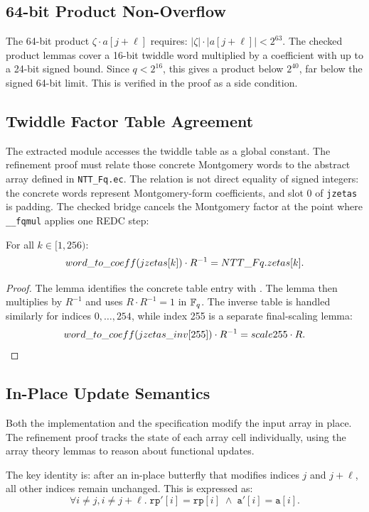 \subsection{64-bit Product Non-Overflow}

The 64-bit product $\zeta \cdot a[j+\ell]$ requires:
$|\zeta| \cdot |a[j+\ell]| < 2^{63}$.  The checked product lemmas cover a
16-bit twiddle word multiplied by a coefficient with up to a 24-bit signed
bound.  Since \(q < 2^{16}\), this gives a product below \(2^{40}\), far below
the signed 64-bit limit.  This is verified in the proof as a side condition.

\subsection{Twiddle Factor Table Agreement}

The \easycrypt{} extracted module accesses the twiddle table as a global
constant.  The refinement proof must relate those concrete Montgomery words
to the abstract  array defined in \texttt{NTT\_Fq.ec}.  The relation
is not direct equality of signed integers: the concrete words represent
Montgomery-form coefficients, and slot 0 of \texttt{jzetas} is padding.
The checked bridge cancels the Montgomery factor at the point where
\texttt{\_\_fqmul} applies one REDC step:

\begin{lemma}
  For all $k \in [1, 256)$:
  \[
    word\_to\_coeff(jzetas[k]) \cdot R^{-1}
      = NTT\_Fq.zetas[k].
  \]
\label{lem:zetas_agree}
\end{lemma}

\begin{proof}
  The lemma  identifies the concrete table entry with
  .  The lemma  then multiplies by
  \(R^{-1}\) and uses \(R\cdot R^{-1}=1\) in \(\mathbb{F}_q\).  The inverse table is
  handled similarly for indices \(0,\dots,254\), while index 255 is a separate
  final-scaling lemma:
  \[
    word\_to\_coeff(jzetas\_inv[255])\cdot R^{-1}
      = scale255\cdot R.
  \]
\end{proof}

\subsection{In-Place Update Semantics}

Both the \jasmin{} implementation and the \easycrypt{} specification modify
the input array in place.  The refinement proof tracks the state of each
array cell individually, using the \easycrypt{} array theory lemmas to reason
about functional updates.

The key identity is: after an in-place butterfly that modifies indices $j$ and
$j+\ell$, all other indices remain unchanged.  This is expressed as:
\[
  \forall i \ne j, i \ne j+\ell.\;
  \texttt{rp}'[i] = \texttt{rp}[i] \;\wedge\;
  \texttt{a}'[i] = \texttt{a}[i].
\]
